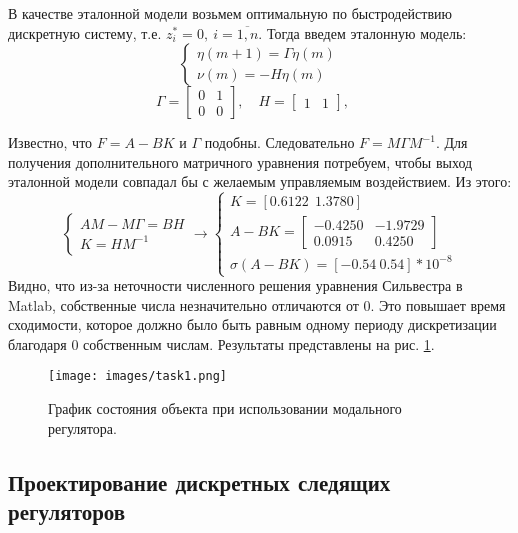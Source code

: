 \documentclass[a4paper, 14pt]{extarticle}
\theoremstyle{definition}
\theoremstyle{plain}
\theoremstyle{remark}
\begin{document}
В качестве эталонной модели возьмем оптимальную по быстродействию дискретную систему, т.е. \(z_i^* = 0,~i=\overline{1,n}\).
Тогда введем эталонную модель:
\[
	\begin{cases}
		\eta(m+1) = \Gamma \eta(m) \\
		\nu(m) = -H \eta(m)
	\end{cases}
\]
\[
	\Gamma = \begin{bmatrix} 0 & 1 \\ 0 & 0 \end{bmatrix}, \quad
	H = \begin{bmatrix} 1 & 1 \end{bmatrix}, \quad
\]

Известно, что \(F = A - BK\) и \(\Gamma\) подобны. Следовательно \(F = M \Gamma M^{-1}\). Для получения дополнительного матричного уравнения потребуем, чтобы выход эталонной модели совпадал бы с желаемым управляемым воздействием.
Из этого:
\[
	\begin{cases}
		AM - M \Gamma = BH \\
		K = HM^{-1}
	\end{cases} \rightarrow
	\begin{cases}
		K = [0.6122~~1.3780]\\
		A - BK = \begin{bmatrix}
			-0.4250 & -1.9729 \\
			0.0915 & 0.4250
			\end{bmatrix} \\
		\sigma(A - BK) = [-0.54 ~ 0.54]*10^{-8}
	\end{cases} 
\]
Видно, что из-за неточности численного решения уравнения Сильвестра в Matlab, собственные числа незначительно отличаются от 0. Это повышает время сходимости, которое должно было быть равным одному периоду дискретизации благодаря 0 собственным числам. Результаты представлены на рис. \ref{fig:task1}.
\begin{figure}
	[H]
	\centering
	\texttt{[image: images/task1.png]}
	\caption{График состояния объекта при использовании модального регулятора.}
	\label{fig:task1}
\end{figure}

\subsection{Проектирование дискретных следящих регуляторов}
\end{document}
